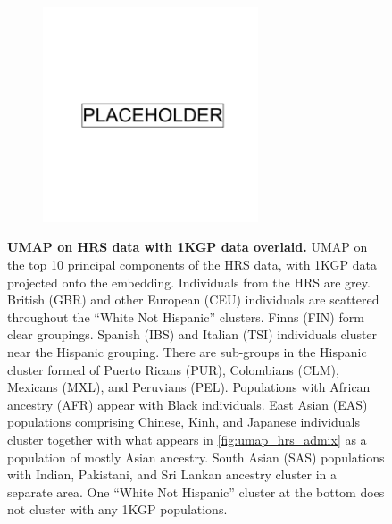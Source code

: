 \begin{figure}[ht]
    \centering
    \begin{subfigure}{\textwidth}
    \includegraphics[width=0.7\textwidth]{placeholder.png}
    \end{subfigure}
    \caption[UMAP on HRS data with 1KGP data overlaid]{\textbf{UMAP on HRS data with 1KGP data overlaid.} UMAP on the top 10 principal components of the HRS data, with 1KGP data projected onto the embedding. Individuals from the HRS are grey. British (GBR) and other European (CEU) individuals are scattered throughout the ``White Not Hispanic'' clusters. Finns (FIN) form clear groupings. Spanish (IBS) and Italian (TSI) individuals cluster near the Hispanic grouping. There are sub-groups in the Hispanic cluster formed of Puerto Ricans (PUR), Colombians (CLM), Mexicans (MXL), and Peruvians (PEL). Populations with African ancestry (AFR) appear with Black individuals. East Asian (EAS) populations comprising Chinese, Kinh, and Japanese individuals cluster together with what appears in \ref{fig:umap_hrs_admix} as a population of mostly Asian ancestry. South Asian (SAS) populations with Indian, Pakistani, and Sri Lankan ancestry cluster in a separate area. One ``White Not Hispanic'' cluster at the bottom does not cluster with any 1KGP populations.}
    \label{fig:supp_hrs_1kgp_projected}
\end{figure}

\newpage

